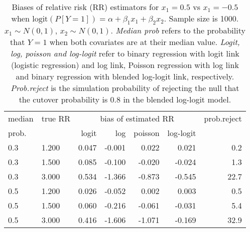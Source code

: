 \documentclass[12pt,a4paper]{article}
\begin{document}
\begin{table}[H] 
\small\sf\centering 
\caption{Biases of relative risk (RR) estimators for $x_1=0.5$ vs $x_1=-0.5$ when $\mbox{logit}(P[Y=1])=\alpha+\beta_1 x_1 + \beta_2 x_2$. Sample size is 1000. $x_1 \sim $$N(0,1)$, $x_2 \sim N(0,1)$. {\it Median prob} refers to the probability that $Y=1$ when both covariates are at their median value. {\it Logit, log, poisson and log-logit} refer to binary regression with logit link (logistic regression) and log link, Poisson regression with log link and binary regression with blended log-logit link, respectively. {\it Prob.reject} is the simulation probability of rejecting the null that the cutover probability is $0.8$ in the blended log-logit model.} 
\begin{tabular}{llrrrrr} 
\toprule 
median & true RR & \multicolumn{4}{c}{bias of estimated RR} & prob.reject \\ 
prob. & & logit & log & poisson & log-logit  & \\ \midrule 
0.3 & 1.200 & 0.047 & -0.001 &  0.022 &  0.021 &  0.2 \\  
0.3 & 1.500 & 0.085 & -0.100 & -0.020 & -0.024 &  1.3 \\  
0.3 & 3.000 & 0.534 & -1.366 & -0.873 & -0.545 & 22.7 \\  
0.5 & 1.200 & 0.026 & -0.052 &  0.002 &  0.003 &  0.5 \\  
0.5 & 1.500 & 0.060 & -0.216 & -0.061 & -0.031 &  5.4 \\  
0.5 & 3.000 & 0.416 & -1.606 & -1.071 & -0.169 & 32.9 \\  
\bottomrule 
\end{tabular} 
\end{table} 
\end{document}

